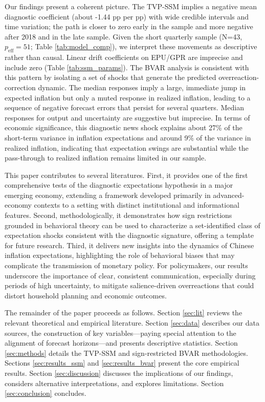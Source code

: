 \documentclass[12pt]{article}
\begin{document}
Our findings present a coherent picture. The TVP-SSM implies a negative mean diagnostic coefficient (about -1.44 pp per pp) with wide credible intervals and time variation; the path is closer to zero early in the sample and more negative after 2018 and in the late sample. Given the short quarterly sample (N=43, $p_{\text{eff}}=51$; Table \ref{tab:model_comp}), we interpret these movements as descriptive rather than causal. Linear drift coefficients on EPU/GPR are imprecise and include zero (Table \ref{tab:ssm_params}). The BVAR analysis is consistent with this pattern by isolating a set of shocks that generate the predicted overreaction-correction dynamic. The median responses imply a large, immediate jump in expected inflation but only a muted response in realized inflation, leading to a sequence of negative forecast errors that persist for several quarters. Median responses for output and uncertainty are suggestive but imprecise. In terms of economic significance, this diagnostic news shock explains about 27\% of the short-term variance in inflation expectations and around 9\% of the variance in realized inflation, indicating that expectation swings are substantial while the pass-through to realized inflation remains limited in our sample.

This paper contributes to several literatures. First, it provides one of the first comprehensive tests of the diagnostic expectations hypothesis in a major emerging economy, extending a framework developed primarily in advanced-economy contexts to a setting with distinct institutional and informational features. Second, methodologically, it demonstrates how sign restrictions grounded in behavioral theory can be used to characterize a set-identified class of expectation shocks consistent with the diagnostic signature, offering a template for future research. Third, it delivers new insights into the dynamics of Chinese inflation expectations, highlighting the role of behavioral biases that may complicate the transmission of monetary policy. For policymakers, our results underscore the importance of clear, consistent communication, especially during periods of high uncertainty, to mitigate salience-driven overreactions that could distort household planning and economic outcomes.

The remainder of the paper proceeds as follows. Section \ref{sec:lit} reviews the relevant theoretical and empirical literature. Section \ref{sec:data} describes our data sources, the construction of key variables—paying special attention to the alignment of forecast horizons—and presents descriptive statistics. Section \ref{sec:methods} details the TVP-SSM and sign-restricted BVAR methodologies. Sections \ref{sec:results_ssm} and \ref{sec:results_bvar} present the core empirical results. Section \ref{sec:discussion} discusses the implications of our findings, considers alternative interpretations, and explores limitations. Section \ref{sec:conclusion} concludes.
\end{document}
